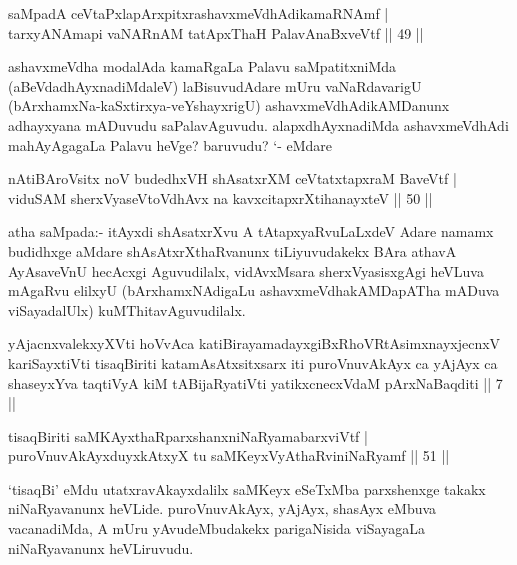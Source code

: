 \begin{shl}
saMpadA ceVtaPxlapArxpitxrashavxmeVdhAdikamaRNAmf |\\
tarxyANAmapi vaNARnAM tatApxThaH PalavAnaBxveVtf \hfill || 49 ||
\end{shl}

\begin{artha}
ashavxmeVdha modalAda kamaRgaLa Palavu saMpatitxniMda (aBeVdadhAyxnadiMdaleV) laBisuvudAdare mUru vaNaRdavarigU (bArxhamxNa-kaSxtirxya-veYshayxrigU) ashavxmeVdhAdikAMDanunx adhayxyana mADuvudu saPalavAguvudu. alapxdhAyxnadiMda ashavxmeVdhAdi mahAyAgagaLa Palavu heVge? baruvudu? `- eMdare \mdash 
\end{artha}

\begin{shl}
nAtiBAroV\s sitx noV budedhxVH shAsatxrXM ceVtatxtapxraM BaveVtf |\\
viduSAM sherxVyaseV\s toV\s dhAvx na kavxcitapxrXtihanayxteV \hfill || 50 ||
\end{shl}

\begin{artha}
atha saMpada:- itAyxdi shAsatxrXvu A tAtapxyaRvuLaLxdeV Adare namamx budidhxge  aMdare shAsAtxrXthaRvanunx tiLiyuvudakekx BAra athavA AyAsaveVnU hecAcxgi Aguvudilalx, vidAvxMsara sherxVyasisxgAgi heVLuva mAgaRvu elilxyU (bArxhamxNAdigaLu ashavxmeVdhakAMDapATha mADuva viSayadalUlx) kuMThitavAguvudilalx.
\end{artha}


\begin{kandikeshl}
yAjacnxvalekxyXVti hoVvAca katiBirayamadayxgiBxRhoVRtAsimxnayxjecnxV kariSayxtiVti tisaqBiriti katamAsAtxsitxsarx iti puroVnuvAkAyx ca yAjAyx ca shaseyxYva taqtiVyA kiM tABijaRyatiVti yatikxcnecxVdaM pArxNaBaqditi || 7 ||
\end{kandikeshl}


\begin{shl}
tisaqBiriti saMKAyxthaRparxshanxniNaRyamabarxviVtf |\\
puroVnuvAkAyxduyxkAtxyX tu saMKeyxVyAthaRviniNaRyamf \hfill || 51 ||
\end{shl}

\begin{artha}
`tisaqBi' eMdu utatxravAkayxdalilx saMKeyx eSeTxMba parxshenxge takakx niNaRyavanunx heVLide. puroVnuvAkAyx, yAjAyx, shasAyx eMbuva vacanadiMda, A mUru yAvudeMbudakekx parigaNisida viSayagaLa niNaRyavanunx heVLiruvudu.
\end{artha}

